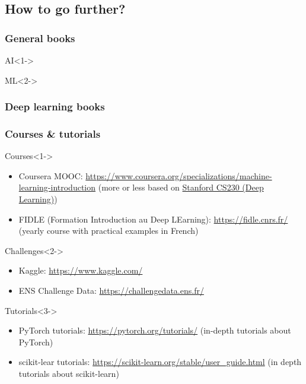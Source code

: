 \subsection{How to go further?}

\begin{frame}
  \frametitle{General books}

  \nocite{*}

  \begin{block}{AI}<1->
    \printbibliography[heading=none,category=AI]
  \end{block}

  \begin{block}{\ac{ML}}<2->
    \printbibliography[heading=none,category=ML]
  \end{block}
\end{frame}

\begin{frame}
  \frametitle{Deep learning books}

  \nocite{*}

  \printbibliography[heading=none,category=deep_learning]
\end{frame}

\begin{frame}
  \frametitle{Courses \& tutorials}

  \begin{block}{Courses}<1->
    \begin{itemize}
    \item Coursera MOOC:
      \url{https://www.coursera.org/specializations/machine-learning-introduction} (more or less based on \href{https://cs230.stanford.edu/}{Stanford CS230 (Deep Learning)})
    \item FIDLE (Formation Introduction au Deep LEarning): \url{https://fidle.cnrs.fr/}
      (yearly course with practical examples in French)
    \end{itemize}
  \end{block}

  \begin{block}{Challenges}<2->
    \begin{itemize}
    \item Kaggle: \url{https://www.kaggle.com/}
    \item ENS Challenge Data: \url{https://challengedata.ens.fr/}
    \end{itemize}
  \end{block}

  \begin{block}{Tutorials}<3->
    \begin{itemize}
    \item PyTorch tutorials: \url{https://pytorch.org/tutorials/} (in-depth
      tutorials about PyTorch)
    \item scikit-lear tutorials:
      \url{https://scikit-learn.org/stable/user_guide.html} (in depth tutorials
      about scikit-learn)
    \end{itemize}
  \end{block}
\end{frame}
